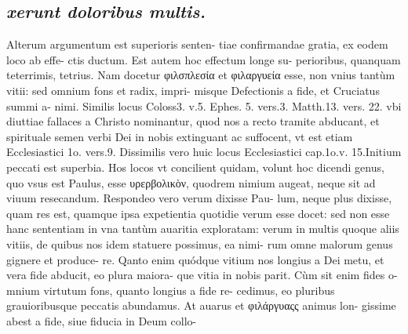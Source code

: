 \documentclass{article}
\begin{document}
\begin{pages}
\subsection*{\textit{xerunt doloribus multis. }}\pstart Alterum argumentum est superioris senten- tiae confirmandae gratia, ex eodem loco ab effe- ctis ductum. Est autem hoc effectum longe su- perioribus, quanquam teterrimis, tetrius. Nam docetur φιλσπλεσία et φιλαργυεία esse, non vnius tantùm vitii: sed omnium fons et radix, impri- misque Defectionis a fide, et Cruciatus summi a- nimi. Similis locus Coloss3. v.5. Ephes. 5. vers.3. Matth.13. vers. 22. vbi diuttiae fallaces a Christo nominantur, quod nos a recto tramite abducant, et spirituale semen verbi Dei in nobis extinguant ac suffocent, vt est etiam Ecclesiastici 1o. vers.9. Dissimilis vero huic locus Ecclesiastici cap.1o.v. 15.Initium peccati est superbia.  \pend\pstart Hos locos vt concilient quidam, volunt hoc dicendi genus, quo vsus est Paulus, esse υρερβολικὸν, quodrem nimium augeat, neque sit ad viuum resecandum. Respondeo vero verum dixisse Pau- lum, neque plus dixisse, quam res est, quamque ipsa expetientia quotidie verum esse docet: sed non esse hanc sententiam in vna tantùm auaritia exploratam: verum in multis quoque aliis vitiis, de quibus nos idem statuere possimus, ea nimi- rum omne malorum genus gignere et produce- re. Qanto enim quódque vitium nos longius a Dei metu, et vera fide abducit, eo plura maiora- que vitia in nobis parit. Cùm sit enim fides o- mnium virtutum fons, quanto longius a fide re- cedimus, eo pluribus grauioribusque peccatis abundamus. At auarus et φιλάργυαςς animus lon- gissime abest a fide, siue fiducia in Deum collo-  \pend

\end{pages}
\end{document}
